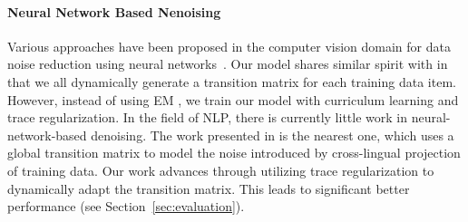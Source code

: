 



\paragraph{Neural Network Based Nenoising} Various approaches have been proposed in the computer vision domain for data noise reduction using neural networks~\cite{sukhbaatar2014training,reed2014training,chen2015webly,xiao2015learning,misra2016seeing}. Our model
shares similar spirit with \cite{misra2016seeing} in that we all dynamically generate a transition matrix for each
training data item. However, instead of using EM , we train our model with curriculum learning and trace regularization.
In the field of NLP, there is currently little work in neural-network-based denoising. The work presented in
\cite{fang2016learning} is the nearest one, which uses a global transition matrix to model the noise introduced by
cross-lingual projection of training data. Our work advances \cite{fang2016learning} through utilizing trace regularization
to dynamically adapt the transition matrix. This leads to significant better performance (see Section~\ref{sec:evaluation}).



